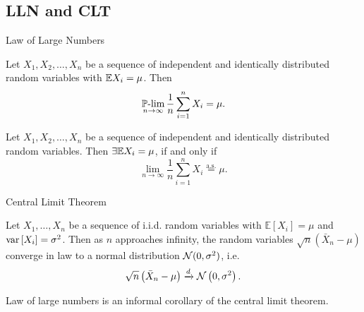 \subsection{LLN and CLT}
    \begin{frame}{Law of Large Numbers}
        \begin{theorem}[Khinchin]
            Let $X_1, X_2, \dots, X_n$ be a sequence of independent and identically distributed random variables with $\mathbb{E} X_i = \mu$. Then
            \begin{equation}
                \operatorname*{\operatorname{\mathbb{P}-lim}}_{n \to \infty} \frac{1}{n} \sum_{i=1}^n X_i = \mu.
            \end{equation}
        \end{theorem}
        \begin{theorem}[Kolmogorov]
            Let $X_1, X_2, \dots, X_n$ be a sequence of independent and identically distributed random variables. Then $\exists \mathbb{E} X_i = \mu$, if and only if
            \begin{equation}
                \lim_{n \to \infty} \frac{1}{n} \sum_{i=1}^n X_i \overset{\text{a.s.}}{=} \mu.
            \end{equation}
        \end{theorem}
    \end{frame}

    \begin{frame}{Central Limit Theorem}
        \begin{theorem}
            Let $X_1, \dots, X_n$ be a sequence of i.i.d. random variables with $\mathbb{E}[X_i] = \mu$ and $\operatorname*{var}\left[X_i\right] = \sigma^2$. 
            Then as $n$ approaches infinity, the random variables $\sqrt{n}(\bar{X}_n - \mu)$ converge in law to a normal distribution ${\cal N}(0, \sigma^2)$, i.e.
            \begin{equation}
                \sqrt{n}\left(\bar{X}_n - \mu\right) \xrightarrow{d} {\cal N}\left(0,\sigma^2\right).
            \end{equation}
        \end{theorem}
        \begin{nb}
            Law of large numbers is an informal corollary of the central limit theorem.
        \end{nb}
    \end{frame}

